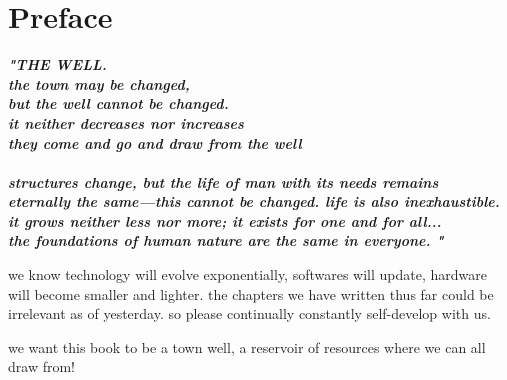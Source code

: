 
\SkipTocEntry\chapter*{Preface}
\addtocounter{section}{1}
\begin{fullwidth}

{\itshape\bfseries "THE WELL.
\\
the town may be changed,
\\
but the well cannot be changed.
\\
it neither decreases nor increases
\\
they come and go and draw from the well
\\
\\
structures change, but the life of man with its needs remains
\\
eternally the same—this cannot be changed. life is also inexhaustible. 
\\
it grows neither less nor more; it exists for one and for all...
\\
the foundations of human nature are the same in everyone. "

}

we know technology will evolve exponentially, softwares will update, hardware will become smaller and lighter. the chapters we have written thus far could be irrelevant as of yesterday. so please continually constantly self-develop with us. 

we want this book to be a town well, a reservoir of resources where we can all draw from!

\clearpage
\end{fullwidth}
